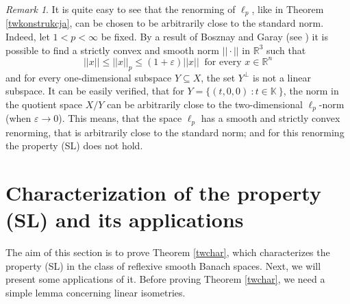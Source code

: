 \documentclass[12pt, reqno]{amsart}
\theoremstyle{definition}
\theoremstyle{remark}
\newtheorem{remark}[theorem]{Remark}
\numberwithin{equation}{section}
\begin{document}
\begin{remark}
\label{remarklp}
It is quite easy to see that the renorming of $\ell_p$, like in Theorem \ref{twkonstrukcja}, can be chosen to be arbitrarily close to the standard norm. Indeed, let $1 < p < \infty$ be fixed. By a result of Bosznay and Garay (see \cite{bosznay}) it is possible to find a strictly convex and smooth norm $|| \cdot ||$ in $\mathbb{R}^3$ such that
$$||x|| \leq ||x||_p \leq (1 + \varepsilon)||x|| \: \text{ for every } x \in \mathbb{R}^n$$
and for every one-dimensional subspace $Y \subseteq X$, the set $Y^{\perp}$ is not a linear subspace. It can be easily verified, that for $Y = \{ (t, 0, 0) \ : t \in \mathbb{K}\ \}$, the norm in the quotient space $X/Y$ can be arbitrarily close to the two-dimensional $\ell_p$-norm (when $\varepsilon \to 0$). This means, that the  space $\ell_p$ has a smooth and strictly convex renorming, that is arbitrarily close to the standard norm; and for this renorming the property (SL) does not hold.
\end{remark}


\section{Characterization of the property (SL) and its applications}
\label{sectionchar}
The aim of this section is to prove Theorem \ref{twchar}, which characterizes the property (SL) in the class of reflexive smooth Banach spaces. Next, we will present some applications of it. Before proving Theorem \ref{twchar}, we need a simple lemma concerning linear isometries.
\end{document}
